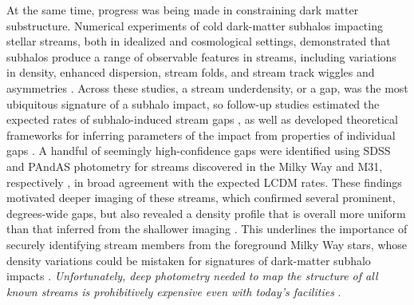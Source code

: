 \documentclass[final,5p,times,twocolumn,authoryear]{elsarticle}
\begin{document}
At the same time, progress was being made in constraining dark matter substructure.
Numerical experiments of cold dark-matter subhalos impacting stellar streams, both in idealized and cosmological settings, demonstrated that subhalos produce a range of observable features in streams, including variations in density, enhanced dispersion, stream folds, and stream track wiggles and asymmetries \citep{carlberg:2009, yoon:2011, erkal:2015a, ngan:2015, ngan:2016, sandford:2017}.
Across these studies, a stream underdensity, or a gap, was the most ubiquitous signature of a subhalo impact, so follow-up studies estimated the expected rates of subhalo-induced stream gaps \citep{carlberg:2012b, ngan:2014, erkal:2016, banik:2018}, as well as developed theoretical frameworks for inferring parameters of the impact from properties of individual gaps \citep{carlberg:2013b, erkal:2015a, erkal:2015b, helmi:2016, sanders:2016, koppelman:2021}.
A handful of seemingly high-confidence gaps were identified using SDSS and PAndAS photometry for streams discovered in the Milky Way and M31, respectively \citep{carlberg:2011, carlberg:2012, carlberg:2013, carlberg:2016b, carlberg:2016}, in broad agreement with the expected LCDM rates.
These findings motivated deeper imaging of these streams, which confirmed several prominent, degrees-wide gaps, but also revealed a density profile that is overall more uniform than that inferred from the shallower imaging \citep{ibata:2016, erkal:2017, bovy:2017, deboer:2018, bonaca:2020}.
This underlines the importance of securely identifying stream members from the foreground Milky Way stars, whose density variations could be mistaken for signatures of dark-matter subhalo impacts \citep{thomas:2016}.
\emph{Unfortunately, deep photometry needed to map the structure of all known streams is prohibitively expensive even with today's facilities} .
\end{document}
